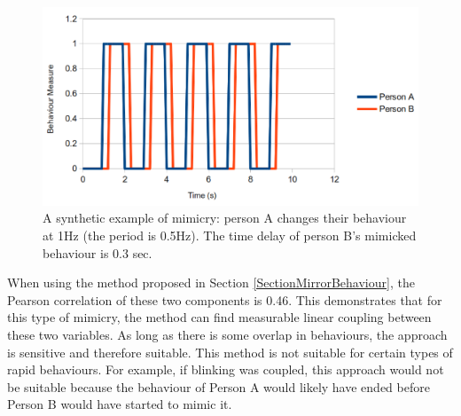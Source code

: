 \begin{appendices}
\begin{figure}
\centering
\includegraphics[width = 0.80 \columnwidth]{conclusion/mimicry-pearsons.png}

\caption[Synthetic example of mimicry]{A synthetic example of mimicry: person A changes their behaviour at 1Hz (the period is 0.5Hz). The time delay of person B's mimicked behaviour is 0.3 sec.}
\label{FigureMimicryCorellation}
\end{figure}

When using the method proposed in Section \ref{SectionMirrorBehaviour}, the Pearson correlation of these two components is 0.46. This demonstrates that for this type of mimicry, the method can find measurable linear coupling between these two variables. As long as there is some overlap in behaviours, the approach is sensitive and therefore suitable. This method is not suitable for certain types of rapid behaviours. For example, if blinking was coupled, this approach would not be suitable because the behaviour of Person A would likely have ended before Person B would have started to mimic it.

\end{appendices}